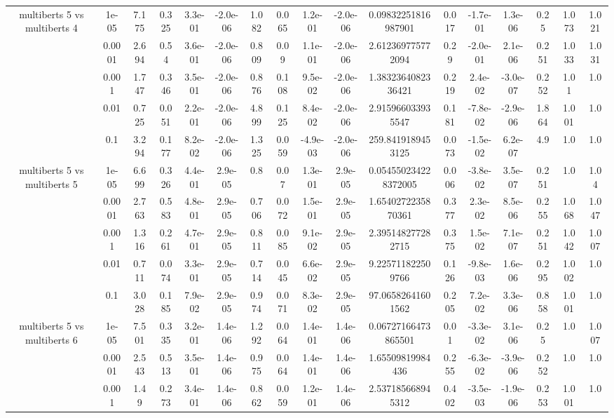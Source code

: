 \begin{tabular}{|c|c|c|c|c|c|c|c|c|c|c|c|c|c|c|c|c|}
\hline
\multirow{5}{*}{multiberts 5 vs multiberts 4} & 1e-05 & 7.175 & 0.325 & 3.3e-01 & -2.0e-06 & 1.082 & 0.065 & 1.2e-01 & -2.0e-06 & 0.09832251816987901 & 0.017 & -1.7e-01 & 1.3e-06 & 0.25 & 1.073 & 1.021 \\
 & 0.0001 & 2.694 & 0.54 & 3.6e-01 & -2.0e-06 & 0.809 & 0.09 & 1.1e-01 & -2.0e-06 & 2.612369775772094 & 0.29 & -2.0e-01 & 2.1e-06 & 0.251 & 1.033 & 1.031 \\
 & 0.001 & 1.747 & 0.346 & 3.5e-01 & -2.0e-06 & 0.876 & 0.108 & 9.5e-02 & -2.0e-06 & 1.3832364082336421 & 0.219 & 2.4e-02 & -3.0e-07 & 0.252 & 1.01 & 1.0 \\
 & 0.01 & 0.725 & 0.051 & 2.2e-01 & -2.0e-06 & 4.899 & 0.125 & 8.4e-02 & -2.0e-06 & 2.915966033935547 & 0.181 & -7.8e-02 & -2.9e-06 & 1.864 & 1.001 & 1.0 \\
 & 0.1 & 3.294 & 0.177 & 8.2e-02 & -2.0e-06 & 1.325 & 0.059 & -4.9e-03 & -2.0e-06 & 259.8419189453125 & 0.073 & -1.5e-02 & 6.2e-07 & 4.9 & 1.0 & 1.0 \\
\hline
\multirow{5}{*}{multiberts 5 vs multiberts 5} & 1e-05 & 6.699 & 0.326 & 4.4e-01 & 2.9e-05 & 0.8 & 0.07 & 1.3e-01 & 2.9e-05 & 0.054550234228372005 & 0.006 & -3.8e-02 & 3.5e-07 & 0.251 & 1.0 & 1.04 \\
 & 0.0001 & 2.763 & 0.583 & 4.8e-01 & 2.9e-05 & 0.706 & 0.072 & 1.5e-01 & 2.9e-05 & 1.6540272235870361 & 0.377 & 2.3e-02 & 8.5e-06 & 0.255 & 1.068 & 1.047 \\
 & 0.001 & 1.316 & 0.261 & 4.7e-01 & 2.9e-05 & 0.811 & 0.085 & 9.1e-02 & 2.9e-05 & 2.395148277282715 & 0.375 & 1.5e-02 & 7.1e-07 & 0.251 & 1.042 & 1.007 \\
 & 0.01 & 0.711 & 0.074 & 3.3e-01 & 2.9e-05 & 0.714 & 0.045 & 6.6e-02 & 2.9e-05 & 9.225711822509766 & 0.126 & -9.8e-03 & 1.6e-06 & 0.295 & 1.002 & 1.0 \\
 & 0.1 & 3.028 & 0.185 & 7.9e-02 & 2.9e-05 & 0.974 & 0.071 & 8.3e-02 & 2.9e-05 & 97.06582641601562 & 0.205 & 7.2e-02 & 3.3e-06 & 0.858 & 1.001 & 1.0 \\
\hline
\multirow{5}{*}{multiberts 5 vs multiberts 6} & 1e-05 & 7.501 & 0.335 & 3.2e-01 & 1.4e-06 & 1.292 & 0.064 & 1.4e-01 & 1.4e-06 & 0.06727166473865501 & 0.01 & -3.3e-02 & 3.1e-06 & 0.25 & 1.0 & 1.007 \\
 & 0.0001 & 2.543 & 0.513 & 3.5e-01 & 1.4e-06 & 0.975 & 0.064 & 1.4e-01 & 1.4e-06 & 1.65509819984436 & 0.255 & -6.3e-02 & -3.9e-06 & 0.252 & 1.0 & 1.0 \\
 & 0.001 & 1.49 & 0.273 & 3.4e-01 & 1.4e-06 & 0.862 & 0.059 & 1.2e-01 & 1.4e-06 & 2.537185668945312 & 0.402 & -3.5e-03 & -1.9e-06 & 0.253 & 1.001 & 1.0 \\

\end{tabular}
